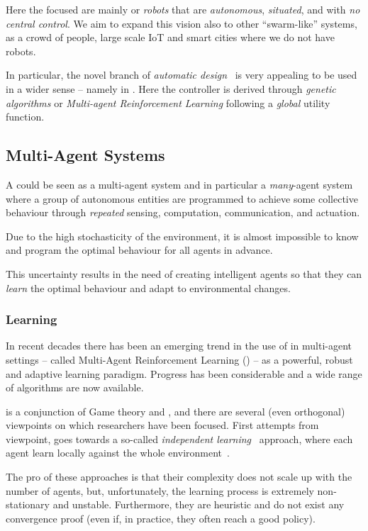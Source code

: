 \documentclass[11pt]{article}
\begin{document}
Here the focused are mainly or \textit{robots} that are \emph{autonomous}, \emph{situated}, and with \emph{no central control}. We aim to expand this vision also to other ``swarm-like'' systems, as a crowd of people, large scale IoT and smart cities where we do not have robots. 

In particular, the novel branch of \textit{automatic design}~\cite{DBLP:journals/firai/FrancescaB16} is very appealing to be used in a wider sense -- namely in \cpsw{}. Here the controller is derived through \textit{genetic algorithms} or \textit{Multi-agent Reinforcement Learning} following a \textit{global} utility function. 
\subsection{Multi-Agent Systems}
A \cpsw{} could be seen as a multi-agent system and in particular a \emph{many}-agent system where a group of autonomous entities are programmed to achieve some collective behaviour through \emph{repeated} sensing, computation, communication, and actuation.

Due to the high stochasticity of the environment, it is almost impossible to know and program the optimal behaviour for all agents in advance.

This uncertainty results in the need of creating intelligent agents so that they can \emph{learn} the optimal behaviour and adapt to environmental changes.
\subsubsection{Learning}
In recent decades there has been an emerging trend in the use of \rl{} 
in multi-agent settings -- called Multi-Agent Reinforcement Learning (\marl{}) -- as a powerful, robust and adaptive learning paradigm.
%
Progress has been considerable and a wide range of algorithms are now available.

\marl{} is a conjunction of Game theory and \rl{}, 
 and there are several (even orthogonal) viewpoints on which researchers have been focused.
First attempts from \rl{} viewpoint, 
 goes towards a so-called \textit{independent learning}~\cite{DBLP:journals/tsmc/BusoniuBS08} approach, where each agent learn locally against the whole environment~\cite{DBLP:conf/icml/Tan93}.

The pro of these approaches is that their complexity does not scale up with the number of agents, 
 but, unfortunately, the learning process is extremely non-stationary and unstable.
% 
Furthermore, they are heuristic and do not exist any convergence proof (even if, in practice, they often reach a good policy).
\end{document}
